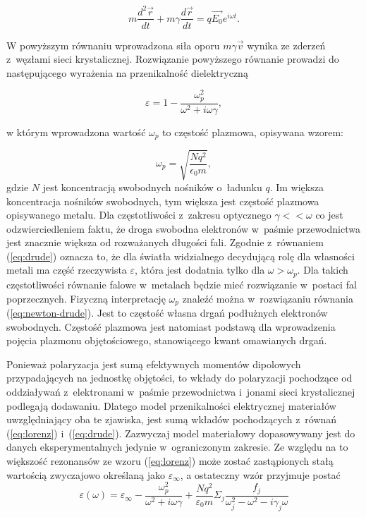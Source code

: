 \begin{equation}
m \frac{d^2\vec{r}}{dt} + m \gamma \frac{d\vec{r}}{dt} = q \vec{E_0}e^{i\omega t}.
\label{eq:newton-drude}
\end{equation}

W powyższym równaniu wprowadzona siła oporu $m \gamma \vec{v}$ wynika ze zderzeń z~węzłami sieci krystalicznej. Rozwiązanie powyższego równanie prowadzi do następującego wyrażenia na przenikalność dielektryczną

\begin{equation}
\varepsilon= 1 - \frac{\omega_p^2}{\omega^2+i\omega \gamma},
\label{eq:drude}
\end{equation}

w którym wprowadzona wartość $\omega_p$ to częstość plazmowa, opisywana wzorem:

\begin{equation}
\omega_p = \sqrt{\frac{N q^2}{\epsilon_0 m}},
\label{eq:omega-plazmowa}
\end{equation}
gdzie $N$ jest koncentracją swobodnych nośników o~ładunku $q$. Im większa koncentracja nośników swobodnych, tym większa jest częstość plazmowa opisywanego metalu.  Dla częstotliwości z~zakresu optycznego $\gamma<<\omega$ co jest odzwierciedleniem faktu, że droga swobodna elektronów w~paśmie przewodnictwa jest znacznie większa od rozważanych długości fali. Zgodnie z~równaniem  (\ref{eq:drude}) oznacza to, że dla światła widzialnego decydującą rolę dla własności metali ma część rzeczywista $\varepsilon$, która jest dodatnia tylko dla $\omega>\omega_p$. Dla takich częstotliwości równanie falowe w~metalach będzie mieć rozwiązanie w~postaci fal poprzecznych. Fizyczną interpretację $\omega_p$ znaleźć można w~rozwiązaniu równania (\ref{eq:newton-drude}). Jest to częstość własna drgań podłużnych elektronów swobodnych. Częstość plazmowa jest natomiast podstawą dla wprowadzenia pojęcia plazmonu objętościowego, stanowiącego kwant omawianych drgań.

Ponieważ polaryzacja jest sumą efektywnych momentów dipolowych przypadających na jednostkę objętości, to wkłady do polaryzacji pochodzące od oddziaływań z~elektronami w~paśmie przewodnictwa i~jonami sieci krystalicznej podlegają dodawaniu. Dlatego model przenikalności elektrycznej materiałów uwzględniający oba te zjawiska, jest sumą wkładów pochodzących z~równań (\ref{eq:lorenz}) i~(\ref{eq:drude}). Zazwyczaj model materiałowy dopasowywany jest do danych eksperymentalnych jedynie w~ograniczonym zakresie. Ze względu na to większość rezonansów ze wzoru (\ref{eq:lorenz}) może zostać zastąpionych stałą wartością zwyczajowo określaną jako $\varepsilon_\infty$, a ostateczny wzór przyjmuje postać
\begin{equation}
\varepsilon(\omega)=\varepsilon_\infty- \frac{\omega_p^2}{\omega^2+i\omega\gamma} +\frac{Nq^2}{\varepsilon_0 m} \Sigma_j \frac{f_j}{\omega_j^2-\omega^2-i\gamma_j\omega}
\label{eq:lorenz-drude}
\end{equation}

